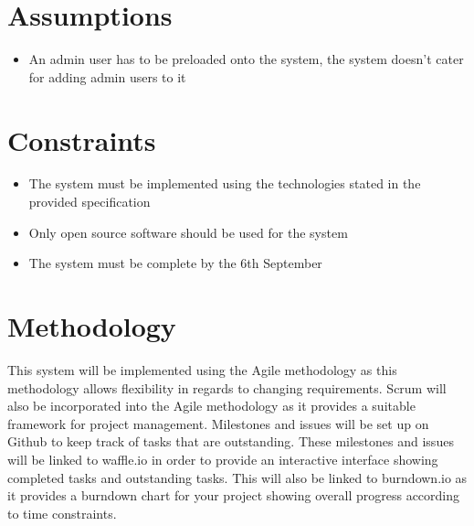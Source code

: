 \documentclass[a4paper,10pt]{article}
\begin{document}
\section{Assumptions}
\begin{itemize}
	\item An admin user has to be preloaded onto the system, the system doesn’t cater for adding admin users to it
\end{itemize}

\section{Constraints}
\begin{itemize}
	\item The system must be implemented using the technologies stated in the provided specification
	\item Only open source software should be used for the system
	\item The system must be complete by the 6th September
\end{itemize}

\section{Methodology}
This system will be implemented using the Agile methodology as this methodology allows flexibility in regards to changing requirements. Scrum will also be incorporated into the Agile methodology as it provides a suitable framework for project management. Milestones and issues will be set up on Github to keep track of tasks that are outstanding. These milestones and issues will be linked to waffle.io in order to provide an interactive interface showing completed tasks and outstanding tasks. This will also be linked to burndown.io as it provides a burndown chart for your project showing overall progress according to time constraints.




\newpage
\clearpage
\end{document}
